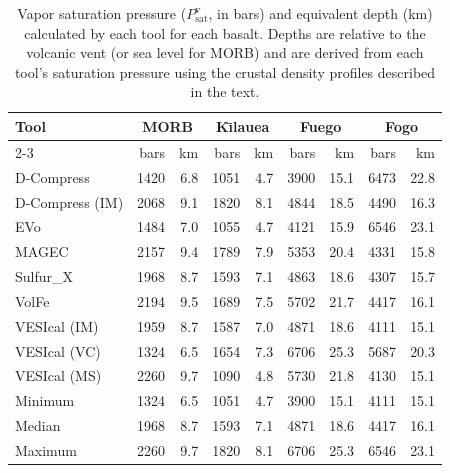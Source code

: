 \begin{table}[!thbp]
    \centering
    \caption{Vapor saturation pressure ($P_\mathrm{sat}^\mathrm{v}$, in bars) and equivalent depth (km) calculated by each tool for each basalt. Depths are relative to the volcanic vent (or sea level for MORB) and are derived from each tool's saturation pressure using the crustal density profiles described in the text.}
    \begin{tabular}{lrrrrrrrr}
    \toprule
        \multirow{2}{*}{Tool} & \multicolumn{2}{c}{MORB} & \multicolumn{2}{c}{K\={\i}lauea} & \multicolumn{2}{c}{Fuego} & \multicolumn{2}{c}{Fogo} \\
        \cline{2-3} \cline{4-5} \cline{6-7} \cline{8-9}
         & bars & km & bars & km & bars & km & bars & km \\
    \midrule
        D-Compress & 1420 & 6.8 & 1051 & 4.7 & 3900 & 15.1 & 6473 & 22.8 \\
        D-Compress (IM) & 2068 & 9.1 & 1820 & 8.1 & 4844 & 18.5 & 4490 & 16.3 \\
        EVo & 1484 & 7.0 & 1055 & 4.7 & 4121 & 15.9 & 6546 & 23.1 \\
        MAGEC & 2157 & 9.4 & 1789 & 7.9 & 5353 & 20.4 & 4331 & 15.8 \\
        Sulfur\_X & 1968 & 8.7 & 1593 & 7.1 & 4863 & 18.6 & 4307 & 15.7 \\
        VolFe & 2194 & 9.5 & 1689 & 7.5 & 5702 & 21.7 & 4417 & 16.1 \\
        VESIcal (IM) & 1959 & 8.7 & 1587 & 7.0 & 4871 & 18.6 & 4111 & 15.1 \\
        VESIcal (VC) & 1324 & 6.5 & 1654 & 7.3 & 6706 & 25.3 & 5687 & 20.3 \\
        VESIcal (MS) & 2260 & 9.7 & 1090 & 4.8 & 5730 & 21.8 & 4130 & 15.1 \\
        \noalign{\medskip}
        Minimum & 1324 & 6.5 & 1051 & 4.7 & 3900 & 15.1 & 4111 & 15.1 \\
        Median & 1968 & 8.7 & 1593 & 7.1 & 4871 & 18.6 & 4417 & 16.1 \\
        Maximum & 2260 & 9.7 & 1820 & 8.1 & 6706 & 25.3 & 6546 & 23.1 \\
    \bottomrule
    \end{tabular}
    \label{table:SatP_depth}
\end{table}
